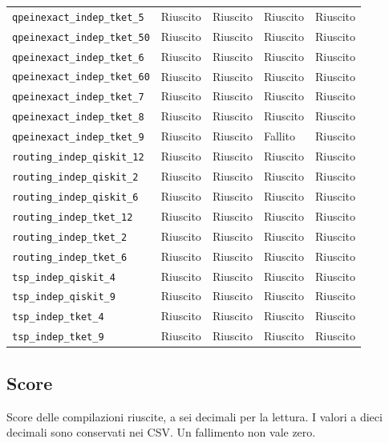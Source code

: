 \begin{longtable}{>{\raggedright\arraybackslash}p{6.8cm}>{\centering\arraybackslash}p{2.0cm}>{\centering\arraybackslash}p{2.0cm}>{\centering\arraybackslash}p{2.0cm}>{\centering\arraybackslash}p{2.0cm}}
\nolinkurl{qpeinexact_indep_tket_5} & Riuscito & Riuscito & Riuscito & Riuscito \\
\nolinkurl{qpeinexact_indep_tket_50} & Riuscito & Riuscito & Riuscito & Riuscito \\
\nolinkurl{qpeinexact_indep_tket_6} & Riuscito & Riuscito & Riuscito & Riuscito \\
\nolinkurl{qpeinexact_indep_tket_60} & Riuscito & Riuscito & Riuscito & Riuscito \\
\nolinkurl{qpeinexact_indep_tket_7} & Riuscito & Riuscito & Riuscito & Riuscito \\
\nolinkurl{qpeinexact_indep_tket_8} & Riuscito & Riuscito & Riuscito & Riuscito \\
\nolinkurl{qpeinexact_indep_tket_9} & Riuscito & Riuscito & Fallito & Riuscito \\
\nolinkurl{routing_indep_qiskit_12} & Riuscito & Riuscito & Riuscito & Riuscito \\
\nolinkurl{routing_indep_qiskit_2} & Riuscito & Riuscito & Riuscito & Riuscito \\
\nolinkurl{routing_indep_qiskit_6} & Riuscito & Riuscito & Riuscito & Riuscito \\
\nolinkurl{routing_indep_tket_12} & Riuscito & Riuscito & Riuscito & Riuscito \\
\nolinkurl{routing_indep_tket_2} & Riuscito & Riuscito & Riuscito & Riuscito \\
\nolinkurl{routing_indep_tket_6} & Riuscito & Riuscito & Riuscito & Riuscito \\
\nolinkurl{tsp_indep_qiskit_4} & Riuscito & Riuscito & Riuscito & Riuscito \\
\nolinkurl{tsp_indep_qiskit_9} & Riuscito & Riuscito & Riuscito & Riuscito \\
\nolinkurl{tsp_indep_tket_4} & Riuscito & Riuscito & Riuscito & Riuscito \\
\nolinkurl{tsp_indep_tket_9} & Riuscito & Riuscito & Riuscito & Riuscito \\
\end{longtable}
\endgroup
\clearpage\subsection{Score}
Score delle compilazioni riuscite, a sei decimali per la lettura. I valori a dieci decimali sono conservati nei CSV. Un fallimento non vale zero.
\begingroup\small
\setlength{\tabcolsep}{5pt}
